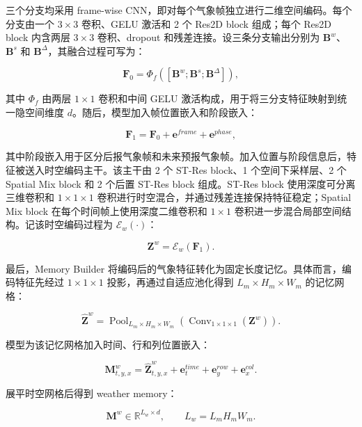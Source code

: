 三个分支均采用 frame-wise CNN，即对每个气象帧独立进行二维空间编码。每个分支由一个 \(3\times3\) 卷积、GELU 激活和 2 个 Res2D block 组成；每个 Res2D block 内含两层 \(3\times3\) 卷积、dropout 和残差连接。设三条分支输出分别为 \(\mathbf{B}^{w}\)、\(\mathbf{B}^{s}\) 和 \(\mathbf{B}^{\Delta}\)，其融合过程可写为：

\begin{equation}
\mathbf{F}_0=\Phi_f\left([\mathbf{B}^{w};\mathbf{B}^{s};\mathbf{B}^{\Delta}]\right),
\end{equation}

其中 \(\Phi_f\) 由两层 \(1\times1\) 卷积和中间 GELU 激活构成，用于将三分支特征映射到统一隐空间维度 \(d\)。随后，模型加入帧位置嵌入和阶段嵌入：

\begin{equation}
\mathbf{F}_1=\mathbf{F}_0+\mathbf{e}^{frame}+\mathbf{e}^{phase},
\end{equation}

其中阶段嵌入用于区分后报气象帧和未来预报气象帧。加入位置与阶段信息后，特征被送入时空编码主干。该主干由 2 个 ST-Res block、1 个空间下采样层、2 个 Spatial Mix block 和 2 个后置 ST-Res block 组成。ST-Res block 使用深度可分离三维卷积和 \(1\times1\times1\) 卷积进行时空混合，并通过残差连接保持特征稳定；Spatial Mix block 在每个时间帧上使用深度二维卷积和 \(1\times1\) 卷积进一步混合局部空间结构。记该时空编码过程为 \(\mathcal{E}_w(\cdot)\)：

\begin{equation}
\mathbf{Z}^{w}=\mathcal{E}_w(\mathbf{F}_1).
\end{equation}

最后，Memory Builder 将编码后的气象特征转化为固定长度记忆。具体而言，编码特征先经过 \(1\times1\times1\) 投影，再通过自适应池化得到 \(L_m\times H_m\times W_m\) 的记忆网格：

\begin{equation}
\hat{\mathbf{Z}}^{w}=\operatorname{Pool}_{L_m\times H_m\times W_m}\left(\operatorname{Conv}_{1\times1\times1}(\mathbf{Z}^{w})\right).
\end{equation}

模型为该记忆网格加入时间、行和列位置嵌入：

\begin{equation}
\mathbf{M}^{w}_{t,y,x}=\hat{\mathbf{Z}}^{w}_{t,y,x}+\mathbf{e}^{time}_{t}+\mathbf{e}^{row}_{y}+\mathbf{e}^{col}_{x}.
\end{equation}

展平时空网格后得到 weather memory：

\begin{equation}
\mathbf{M}^{w}\in\mathbb{R}^{L_w\times d}, \qquad L_w=L_mH_mW_m.
\end{equation}

